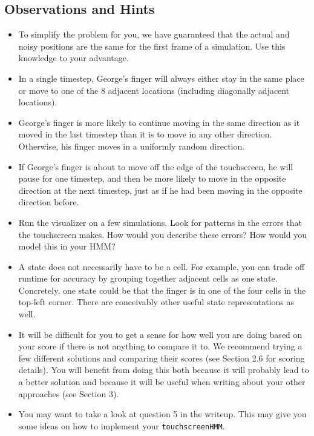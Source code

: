 \documentclass{article}
\begin{document}
    \subsection{Observations and Hints}
    \begin{itemize}
        \item To simplify the problem for you, we have guaranteed that the actual and noisy positions are the same for the first frame of a simulation. Use this knowledge to your advantage.  
        \item In a single timestep, George’s finger will always either stay in the same place or move to one of the 8 adjacent locations (including diagonally adjacent locations).
        \item George’s finger is more likely to continue moving in the same direction as it moved in the last timestep than it is to move in any other direction. Otherwise, his finger moves in a uniformly random direction. 
        \item If George’s finger is about to move off the edge of the touchscreen, he will pause for one timestep, and then be more likely to move in the opposite direction at the next timestep, just as if he had been moving in the opposite direction before.
        \item Run the visualizer on a few simulations. Look for patterns in the errors that the touchscreen makes. How would you describe these errors? How would you model this in your HMM?
        \item A state does not necessarily have to be a cell. For example, you can trade off runtime for accuracy by grouping together adjacent cells as one state. Concretely, one state could be that the finger is in one of the four cells in the top-left corner. There are conceivably other useful state representations as well.
        \item It will be difficult for you to get a sense for how well you are doing based on your score if there is not anything to compare it to. We recommend trying a few different solutions and comparing their scores (see Section 2.6 for scoring details). You will benefit from doing this both because it will probably lead to a better solution and because it will be useful when writing about your other approaches (see Section 3).
        \item You may want to take a look at question 5 in the writeup. This may give you some ideas on how to implement your \texttt{touchscreenHMM}. 
    \end{itemize}
    
\end{document}
